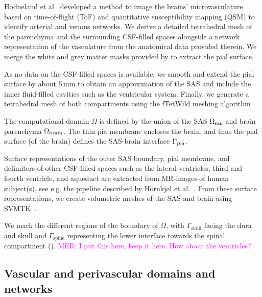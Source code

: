 \documentclass[fleqn,10pt]{wlscirep}
\newcommand{\mer}[1]{\textcolor{magenta}{#1}}
\begin{document}
Hodneland et al~\cite{hodneland2019new} developed a method to image
the brains' microvasculature based on time-of-flight (ToF) and
quantitative susceptibility mapping (QSM) to identify arterial and
venous networks.  We derive a detailed tetrahedral mesh of the
parenchyma and the surrounding CSF-filled spaces alongside a network
representation of the vasculature from the anatomical data provided
therein. We merge the white and grey matter masks provided by
\cite{hodneland2019new} to extract the pial surface.
 


As no data on the CSF-filled spaces is available, we smooth and extend
the pial surface by about 5\,mm to obtain an approximation of the SAS
and include the inner fluid-filled cavities such as the ventricular
system.  Finally, we generate a tetrahedral mesh of both compartments
using the fTetWild meshing algorithm \cite{hu2020fast}.

The computational domain $\Omega$ is defined by the union of the SAS $\Omega_{\rm sas}$ and brain parenchyma $\Omega_{\rm brain}$. The thin pia membrane encloses the brain, and thus the pial surface (of the brain) defines the SAS-brain interface $\Gamma_{\rm pia}$.


Surface representations of the outer SAS boundary, pial membrane, and delimiters of other CSF-filled spaces such as the lateral ventricles, third and fourth ventricle, and aqueduct are extracted from MR-images of human subject(s), see e.g. the pipeline described by Hornkjøl et al.~\cite{hornkjol2022csf}. From these surface representations, we create volumetric meshes of the SAS and brain using SVMTK~\cite{mardal2022mathematical}. 

We mark the different regions of the boundary of $\Omega$, with
$\Gamma_{\mathrm{skull}}$ facing the dura and skull and
$\Gamma_{\mathrm{spine}}$ representing the lower interface towards the
spinal compartment (). \mer{MER: I put this here, keep
  it here. How about the ventricles?}

\subsection*{Vascular and perivascular domains and networks}
\end{document}
